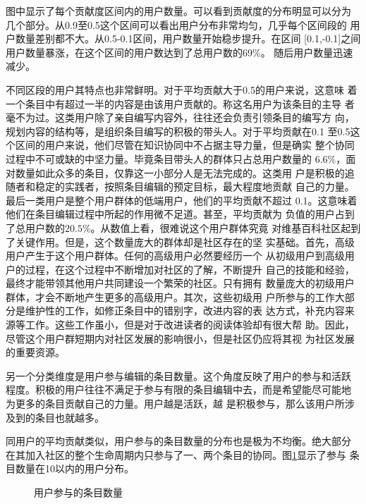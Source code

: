图中显示了每个贡献度区间内的用户数量。可以看到贡献度的分布明显可以分为
几个部分。从0.9至0.5这个区间可以看出用户分布非常均匀，几乎每个区间段的
用户数量差别都不大。从0.5-0.1区间，用户数量开始稳步提升。在区间
[0.1,-0.1]之间用户数量暴涨，在这个区间的用户数达到了总用户数的$69\%$。
随后用户数量迅速减少。

不同区段的用户其特点也非常鲜明。对于平均贡献大于0.5的用户来说，这意味
着一个条目中有超过一半的内容是由该用户贡献的。称这名用户为该条目的主导
者毫不为过。这类用户除了亲自编写内容外，往往还会负责引领条目的编写方
向，规划内容的结构等，是组织条目编写的积极的带头人。对于平均贡献在0.1
至0.5这个区间的用户来说，他们尽管在知识协同中不占据主导力量，但是确实
整个协同过程中不可或缺的中坚力量。毕竟条目带头人的群体只占总用户数量的
$6.6\%$，面对数量如此众多的条目，仅靠这一小部分人是无法完成的。这类用
户是积极的追随者和稳定的实践者，按照条目编辑的预定目标，最大程度地贡献
自己的力量。最后一类用户是整个用户群体的低端用户，他们的平均贡献不超过
0.1。这意味着他们在条目编辑过程中所起的作用微不足道。甚至，平均贡献为
负值的用户占到了总用户数的$20.5\%$。从数值上看，很难说这个用户群体究竟
对维基百科社区起到了关键作用。但是，这个数量庞大的群体却是社区存在的坚
实基础。首先，高级用户产生于这个用户群体。任何的高级用户必然要经历一个
从初级用户到高级用户的过程，在这个过程中不断增加对社区的了解，不断提升
自己的技能和经验，最终才能带领其他用户共同建设一个繁荣的社区。只有拥有
数量庞大的初级用户群体，才会不断地产生更多的高级用户。其次，这些初级用
户所参与的工作大部分是维护性的工作，如修正条目中的错别字，改进内容的表
达方式，补充内容来源等工作。这些工作虽小，但是对于改进读者的阅读体验却有很大帮
助。因此，尽管这个用户群短期内对社区发展的影响很小，但是社区仍应将其视
为社区发展的重要资源。

另一个分类维度是用户参与编辑的条目数量。这个角度反映了用户的参与和活跃
程度。积极的用户往往不满足于参与有限的条目编辑中去，而是希望能尽可能地
为更多的条目贡献自己的力量。用户越是活跃，越
是积极参与，那么该用户所涉及到的条目也就越多。

同用户的平均贡献类似，用户参与的条目数量的分布也是极为不均衡。绝大部分
在其加入社区的整个生命周期内只参与了一、两个条目的协同。图\ref{fig:user-entry-1}显示了参与
条目数量在10以内的用户分布。
\begin{figure}[htb]
  \centering
  \caption{\small{用户参与的条目数量}}
  \label{fig:user-entry-1}
\end{figure}

